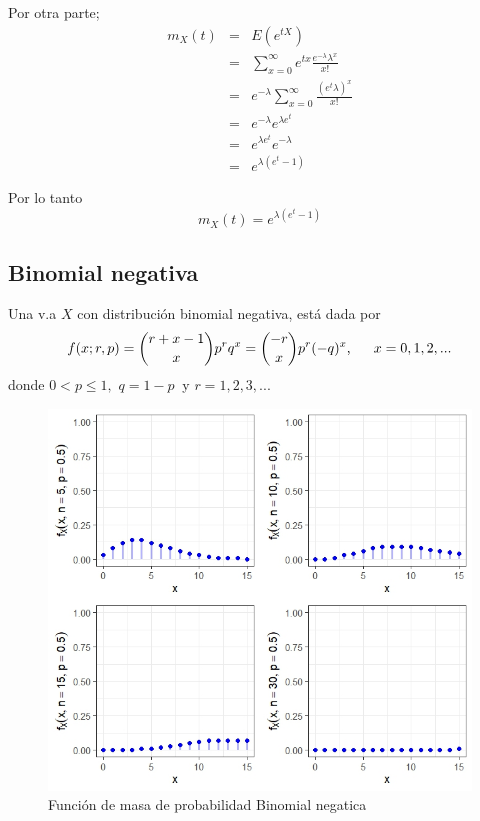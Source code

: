 \begin{i}
Por otra parte; 
\begin{eqnarray*}
m_{X}(t) &=&E(e^{tX}) \\
&=&\sum_{x=0}^{\infty }e^{tx}\frac{e^{-\lambda }\lambda ^{x}}{x!} \\
&=&e^{-\lambda }\sum_{x=0}^{\infty }\frac{\left( e^{t}\lambda \right) ^{x}}{
x!} \\
&=&e^{-\lambda }e^{\lambda e^{t}} \\
&=&e^{\lambda e^{t}}e^{-\lambda } \\
&=&e^{\lambda \left( e^{t}-1\right) }
\end{eqnarray*}

Por lo tanto
\begin{equation*}
m_{X}(t)=e^{\lambda \left( e^{t}-1\right) }
\end{equation*}


\subsection{Binomial negativa}

\begin{definition}
Una v.a $X$ con distribución binomial negativa, está dada por 
\begin{equation*}
f(x;r,p)=\binom{r+x-1}{x}p^{r}q^{x}=\binom{-r}{x}p^{r}(-q)^{x}\text{, \ \ \
\ }x=0,1,2,...
\end{equation*}
donde $0<p\leq 1,$ $q=1-p$ $\ $y $r=1,2,3,...$ 
\end{definition}

\begin{figure}[h!]
\centering
\includegraphics[scale=1]{Figuras/Binomial_negativa.jpeg}
\caption{Función de masa de probabilidad Binomial negatica}
\end{figure}



\end{i}
